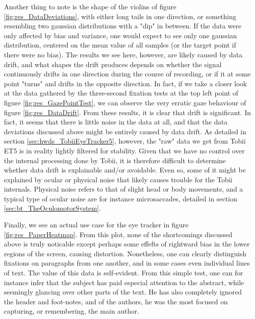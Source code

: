 Another thing to note is the shape of the violins of figure \ref{fig:res_DataDeviations}, with either long tails in one direction, or something resembling two gaussian distributions with a "dip" in between. If the data were only affected by bias and variance, one would expect to see only one gaussian distribution, centered on the mean value of all samples (or the target point if there were no bias). The results we see here, however, are likely caused by data drift, and what shapes the drift produces depends on whether the signal continuously drifts in one direction during the course of recording, or if it at some point "turns" and drifts in the opposite direction. In fact, if we take a closer look at the data gathered by the three-second fixation tests at the top left point of figure \ref{fig:res_GazePointTest}, we can observe the very erratic gaze behaviour of figure \ref{fig:res_DataDrift}. From these results, it is clear that drift is significant. In fact, it seems that there is little noise in the data at all, and that the data deviations discussed above might be entirely caused by data drift. As detailed in section \ref{sec:hwds_TobiiEyeTracker5}, however, the "raw" data we get from Tobii ET5 is in reality lightly filtered for stability. Given that we have no control over the internal processing done by Tobii, it is therefore difficult to determine whether data drift is explainable and/or avoidable. Even so, some of it might be explained by ocular or physical noise that likely causes trouble for the Tobii internals. Physical noise refers to that of slight head or body movements, and a typical type of ocular noise are for instance microsaccades, detailed in section \ref{sec:bt_TheOculomotorSystem}. 

Finally, we see an actual use case for the eye tracker in figure \ref{fig:res_PaperHeatmap}. From this plot, none of the shortcomings discussed above is truly noticable except perhaps some effefts of rightward bias in the lower regions of the screen, causing distortion. Nonetheless, one can clearly distinguish fixations on paragraphs from one another, and in some cases even individual lines of text. The value of this data is self-evident. From this simple test, one can for instance infer that the subject has paid especial attention to the abstract, while seemingly glancing over other parts of the text. He has also completely ignored the header and foot-notes, and of the authors, he was the most focused on capturing, or remembering, the main author.

